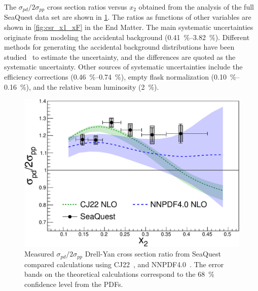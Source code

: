\documentclass[reprint,aps,unsortedaddress,superscriptaddress,prl,floatfix,showpacs,linenumbers]{revtex4-2}
\begin{document}
The $\sigma_{pd}/2\sigma_{pp}$ cross
section ratios versus $x_2$ obtained from the analysis of the full SeaQuest
data set are shown in \cref{fig:xT_csr}. 
The ratios as functions of other variables are shown in \cref{fig:csr_x1_xF} in the End Matter.
The main systematic uncertainties originate from modeling the
accidental background (\qtyrange{0.41}{3.82}{\percent}).
Different methods for generating the accidental background distributions
have been studied~\cite{pate2023} to estimate the uncertainty,
and the differences are quoted as the systematic uncertainty.
Other sources of systematic uncertainties include the efficiency
corrections (\qtyrange{0.46}{0.74}{\percent}),
empty flask normalization (\qtyrange{0.10}{0.16}{\percent}), and the
relative beam luminosity (\SI{2}{\percent}).

\begin{figure}[htbp!]
	\centering
	\includegraphics[width=\linewidth]{data_full_xT_syst.pdf}
	\caption{Measured $\sigma_{pd}/2\sigma_{pp}$ Drell-Yan cross section ratio from SeaQuest compared calculations using
		 CJ22~\cite{accardi2023}, and NNPDF4.0~\cite{ball2022a}.
		The error bands on the theoretical calculations correspond to the \SI{68}{\percent} confidence level from the PDFs.}
	\label{fig:xT_csr}
\end{figure}
\end{document}
